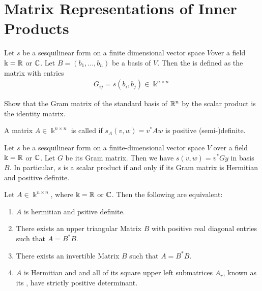 \section{Matrix Representations of Inner Products}
\begin{definition}
	Let $s$ be a sesquilinear form on a finite dimensional vector space $V$over a field $\Bbbk = \mathbb{R}$ or $\mathbb{C}$. Let $B = (b_1, \hdots, b_n)$ be a basis of $V$. Then the  is defined as the matrix with entries
	\begin{align*}
		G_{ij} = s(b_i,b_j) \in \Bbbk^{n \times n}
	\end{align*}
\end{definition}
\begin{exercise}
	Show that the Gram matrix of the standard basis of $\mathbb{R}^n$ by the scalar product is the identity matrix.
\end{exercise}
\begin{definition}
	A matrix $A \in \Bbbk^{n \times n}$ is called  if $s_A(v,w) = v^*Aw$ is positive (semi-)definite.
\end{definition}
\begin{exercise}
	Let $s$ be a sesquilinear form on a finite-dimensional vector space $V$ over a field $\Bbbk = \mathbb{R}$ or $\mathbb{C}$. Let $G$ be its Gram matrix. Then we have $s(v,w) = v^* G y$ in basis $B$. In particular, $s$ is a scalar product if and only if its Gram matrix is Hermitian and positive definite.
\end{exercise}
\begin{theorem}
	Let $A \in \Bbbk^{n \times n}$, where $\Bbbk = \mathbb{R}$ or $\mathbb{C}$. Then the following are equivalent:
	\begin{enumerate}
		\item $A$ is hermitian and psitive definite.
		\item {} There exists an upper triangular Matrix $B$ with positive real diagonal entries such that $A = B^*B$.
		\item There exists an invertible Matrix $B$ such that $A = B^* B$.
		\item {} $A$ is Hermitian and and all of its square upper left submatrices $A_r$, known as its , have strictly positive determinant.
	\end{enumerate}
\end{theorem}
